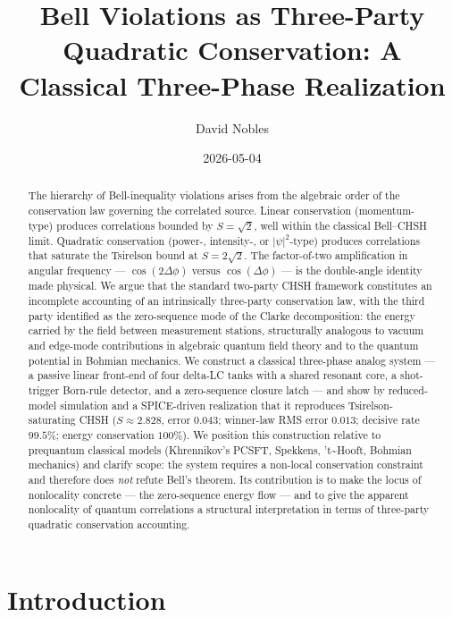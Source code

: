 \documentclass[
  11pt]{article}
\title{Bell Violations as Three-Party Quadratic Conservation: A
Classical Three-Phase Realization}
\author{David Nobles}
\date{2026-05-04}
\begin{document}
\maketitle
\begin{abstract}
The hierarchy of Bell-inequality violations arises from the algebraic
order of the conservation law governing the correlated source. Linear
conservation (momentum-type) produces correlations bounded by
\(S = \sqrt{2}\), well within the classical Bell--CHSH limit. Quadratic
conservation (power-, intensity-, or \(|\psi|^2\)-type) produces
correlations that saturate the Tsirelson bound at \(S = 2\sqrt{2}\). The
factor-of-two amplification in angular frequency ---
\(\cos(2\Delta\phi)\) versus \(\cos(\Delta\phi)\) --- is the
double-angle identity made physical. We argue that the standard
two-party CHSH framework constitutes an incomplete accounting of an
intrinsically three-party conservation law, with the third party
identified as the zero-sequence mode of the Clarke decomposition: the
energy carried by the field between measurement stations, structurally
analogous to vacuum and edge-mode contributions in algebraic quantum
field theory and to the quantum potential in Bohmian mechanics. We
construct a classical three-phase analog system --- a passive linear
front-end of four delta-LC tanks with a shared resonant core, a
shot-trigger Born-rule detector, and a zero-sequence closure latch ---
and show by reduced-model simulation and a SPICE-driven realization that
it reproduces Tsirelson-saturating CHSH (\(S \approx 2.828\), error
\(0.043\); winner-law RMS error \(0.013\); decisive rate \(99.5\%\);
energy conservation \(100\%\)). We position this construction relative
to prequantum classical models (Khrennikov's PCSFT, Spekkens,
't\textasciitilde Hooft, Bohmian mechanics) and clarify scope: the
system requires a non-local conservation constraint and therefore does
\emph{not} refute Bell's theorem. Its contribution is to make the locus
of nonlocality concrete --- the zero-sequence energy flow --- and to
give the apparent nonlocality of quantum correlations a structural
interpretation in terms of three-party quadratic conservation
accounting.
\end{abstract}


\section{Introduction}\label{sec-intro}
\end{document}
